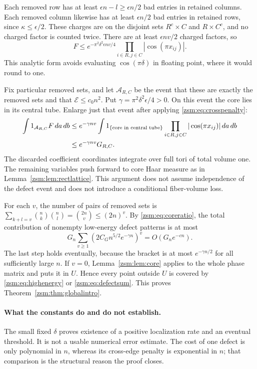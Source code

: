 \documentclass[11pt]{article}
\theoremstyle{definition}\newtheorem{definition}[theorem]{Definition}
\theoremstyle{remark}\newtheorem{remark}[theorem]{Remark}
\begin{document}
Each removed row has at least $\epsilon n-l\ge\epsilon n/2$ bad entries in
retained columns. Each removed column likewise has at least $\epsilon n/2$
bad entries in retained rows, since $\kappa\le\epsilon/2$. These charges are
on the disjoint sets $R^c\times C$ and $R\times C^c$, and no charged factor is
counted twice. There are at least $\epsilon nv/2$ charged factors, so
\begin{equation}\label{zsm:eq:crosspenalty}
 F\le e^{-\pi^2\delta^2\epsilon nv/4}
       \prod_{i\in R,j\in C}|\cos(\pi x_{ij})|.
\end{equation}
This analytic form avoids evaluating $\cos(\pi\delta)$ in floating point,
where it would round to one.

Fix particular removed sets, and let $\mathcal A_{R,C}$ be the event that these
are exactly the removed sets and that $\mathcal E\le c_0n^2$. Put
$\gamma=\pi^2\delta^2\epsilon/4>0$. On this event the core lies in its central
tube. Enlarge just that event after applying \eqref{zsm:eq:crosspenalty}:
\begin{align}
 \int 1_{\mathcal A_{R,C}}F\,da\,db
 &\le e^{-\gamma nv}
 \int1_{\{\text{core in central tube}\}}
       \prod_{i\in R,j\in C}|\cos(\pi x_{ij})|\,da\,db\notag\\
 &\le e^{-\gamma nv}G_{R,C}.\label{zsm:eq:patternintegral}
\end{align}
The discarded coefficient coordinates integrate over full tori of total
volume one. The remaining variables push forward to core Haar measure as in
Lemma~\ref{zsm:lem:rectlattice}. This argument does not assume independence of the
defect event and does not introduce a conditional fiber-volume loss.

For each $v$, the number of pairs of removed sets is
$\sum_{k+l=v}\binom nk\binom nl=\binom{2n}v\le(2n)^v$. By
\eqref{zsm:eq:coreratio}, the total contribution of nonempty low-energy defect
patterns is at most
\begin{equation}\label{zsm:eq:defectsum}
 G_n\sum_{v\ge1}\left(2C_G n^{5/2}e^{-\gamma n}\right)^v
 =O(G_ne^{-cn}).
\end{equation}
The last step holds eventually, because the bracket is at most
$e^{-\gamma n/2}$ for all sufficiently large $n$. If $v=0$,
Lemma~\ref{zsm:lem:core} applies to the whole phase matrix and puts it in $U$.
Hence every point outside $U$ is covered by \eqref{zsm:eq:highenergy} or
\eqref{zsm:eq:defectsum}. This proves Theorem~\ref{zsm:thm:globalintro}.

\paragraph{What the constants do and do not establish.}
The small fixed $\delta$ proves existence of a positive localization rate and
an eventual threshold. It is not a usable numerical error estimate. The cost
of one defect is only polynomial in $n$, whereas its cross-edge penalty is
exponential in $n$; that comparison is the structural reason the proof closes.
\end{document}
